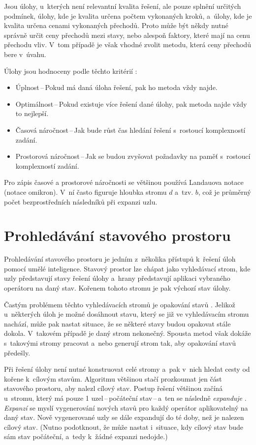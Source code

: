 Jsou úlohy, u~kterých není relevantní kvalita řešení, ale pouze splnění určitých podmínek, úlohy, kde je kvalita určena počtem vykonaných kroků, a~úlohy, kde je kvalita určena cenami vykonaných přechodů. Proto může být někdy nutné správně určit ceny přechodů mezi stavy, nebo alespoň faktory, které mají na cenu přechodu vliv. V~tom případě je však vhodné zvolit metodu, která ceny přechodů bere v~úvahu.

Úlohy jsou hodnoceny podle těchto kritérií \cite{AI_Russel_Norvig}:
\begin{itemize}
    \item Úplnost\,--\,Pokud má daná úloha řešení, pak ho metoda vždy najde.
    \item Optimálnost\,--\,Pokud existuje více řešení dané úlohy, pak metoda najde vždy to nejlepší.
    \item Časová náročnost\,--\,Jak bude růst čas hledání řešení s~rostoucí komplexností zadání.
    \item Prostorová náročnost\,--\,Jak se budou zvyšovat požadavky na paměť s~rostoucí komplexností zadání.
\end{itemize}

Pro zápis časové a prostorové náročnosti se většinou používá Landauova notace (notace omikron). V~ní často figuruje hloubka stromu $d$ a~tzv.  $b$, což je průměrný počet bezprostředních následníků při expanzi uzlu.


\section{Prohledávání stavového prostoru}

Prohledávání stavového prostoru je jedním z~několika přístupů k~řešení úloh pomocí umělé inteligence. Stavový prostor lze chápat jako vyhledávací strom, kde uzly představují stavy řešení úlohy a~hrany představují aplikaci vybraného operátoru na daný stav. Kořenem tohoto stromu je pak výchozí stav úlohy.

Častým problémem těchto vyhledávacích stromů je opakování stavů \cite{AI_Russel_Norvig}. Jelikož u~některých úloh je možné dosáhnout stavu, který se již ve vyhledávacím stromu nachází, může pak nastat situace, že se některé stavy budou opakovat stále dokola. V~takovém případě je daný strom nekonečný. Spousta metod však dokáže s~takovými stromy pracovat a~nebo generují strom tak, aby opakování stavů předešly.

Při řešení úlohy není nutné konstruovat celé stromy a~pak v~nich hledat cesty od kořene k~cílovým stavům. Algoritmu většinou stačí prozkoumat jen část stavového prostoru, aby nalezl cílový stav. Postup řešení většinou začíná u~stromu, který má pouze 1 uzel\,--\,počáteční stav\,--\,a~ten se následně \emph{expanduje} \cite{AI_Russel_Norvig}. \emph{Expanzí} se myslí vygenerování nových stavů pro každý operátor aplikovatelný na daný stav. Nově vygenerované uzly se dále expandují do té doby, než je nalezen cílový stav. (Nutno podotknout, že může nastat i~situace, kdy cílový stav bude sám stav počáteční, a~tedy k~žádné expanzi nedojde.)


